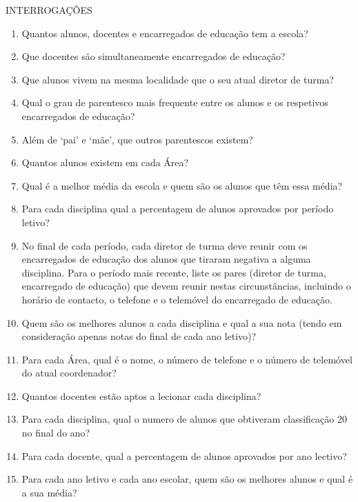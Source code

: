\documentclass[12pt,a4paper,reqno]{report}
\numberwithin{figure}{section}
\numberwithin{equation}{section}
\begin{document}
INTERROGAÇÕES

\begin{enumerate}
	
	\item Quantos alunos, docentes e encarregados de educação tem a escola?
	
	\item Que docentes são simultaneamente encarregados de educação?
	
	\item Que alunos vivem na mesma localidade que o seu atual diretor de turma?
	
	\item Qual o grau de parentesco mais frequente entre os alunos e os respetivos encarregados de educação?
	
	\item Além de `pai' e `mãe', que outros parentescos existem?
	
	\item Quantos alunos existem em cada Área?
	
	\item Qual é a melhor média da escola e quem são os alunos que têm essa média?
	
	\item Para cada disciplina qual a percentagem de alunos aprovados por período letivo?
	
	\item No final de cada período, cada diretor de turma deve reunir com os encarregados de educação dos alunos que tiraram negativa a alguma disciplina. Para o período mais recente, liste os pares (diretor de turma, encarregado de educação) que devem reunir nestas circunstâncias, incluindo o horário de contacto, o telefone e o telemóvel do encarregado de educação.
	
	\item Quem são os melhores alunos a cada disciplina e qual a sua nota (tendo em consideração apenas notas do final de cada ano letivo)?
	
	\item Para cada Área, qual é o nome, o número de telefone e o número de telemóvel do atual coordenador?
	
	\item Quantos docentes estão aptos a lecionar cada disciplina?
	
	\item Para cada disciplina, qual o numero de alunos que obtiveram classificação 20 no final do ano?
	
	\item Para cada docente, qual a percentagem de alunos aprovados por ano lectivo?
		
	\item Para cada ano letivo e cada ano escolar, quem são os melhores alunos e qual é a sua média?
	
\end{enumerate}
\end{document}

